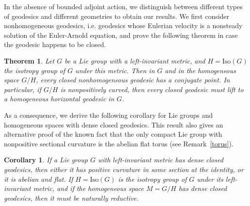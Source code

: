\documentclass[oneside, 11pt]{amsart}
\newtheorem*{theorem*}{Theorem}
\newtheorem*{corollary*}{Corollary}
\numberwithin{equation}{section}
\begin{document}
In the absence of bounded adjoint action, we distinguish between different types of geodesics and different geometries to obtain our results. We first consider nonhomogeneous geodesics, i.e. geodesics whose Eulerian velocity is a nonsteady solution of the Euler-Arnold equation, and prove the following theorem in case the geodesic happens to be closed.

\begin{theorem*}
Let $G$ be a Lie group with a left-invariant metric, and $H=\mathrm{Iso}(G)$ the isotropy group of $G$ under this metric. Then in $G$ and in the homogeneous space $G/H$,  every closed nonhomogeneous geodesic has a conjugate point. In particular,  if $G/H$ is nonpositively curved, then every closed geodesic must lift to a homogeneous horizontal geodesic in $G$. 
\end{theorem*}
As a consequence, we derive the following corollary for Lie groups and homogeneous spaces with dense closed geodesics. This result also gives an alternative proof of the known fact that the only compact Lie group with nonpositive sectional curvature is the abelian flat torus (see Remark~\ref{torus}). 

\begin{corollary*} 
If a Lie group $G$ with left-invariant metric has dense closed geodesics, then either it has positive curvature in some section at the identity, or it is abelian and flat. If $H=\mathrm{Iso}(G)$ is the isotropy group of $G$ under its left-invariant metric, and if the homogeneous space $M=G/H$ has dense closed geodesics, then it must be naturally reductive. 
\end{corollary*}
\end{document}
